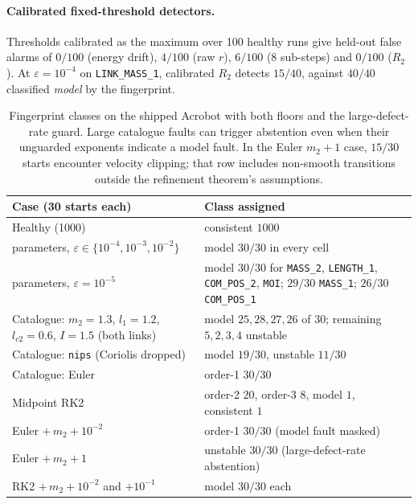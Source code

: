 \documentclass[10pt]{article}
\theoremstyle{definition}
\begin{document}
\paragraph{Calibrated fixed-threshold detectors.}
Thresholds calibrated as the maximum over 100 healthy runs give held-out
false alarms of $0/100$ (energy drift), $4/100$ (raw $r$), $6/100$
(8 sub-steps) and $0/100$ ($R_2$). At $\varepsilon=10^{-4}$ on
\texttt{LINK\_MASS\_1}, calibrated $R_2$ detects $15/40$, against $40/40$
classified \emph{model} by the fingerprint.

\begin{table}[htbp]
\centering\small
\begin{tabular}{>{\raggedright\arraybackslash}p{5.4cm}>{\raggedright\arraybackslash}p{8.6cm}}
\toprule
Case (30 starts each) & Class assigned \\
\midrule
Healthy (1000) & consistent $1000$ \\
6 parameters, $\varepsilon\in\{10^{-4},10^{-3},10^{-2}\}$ & model $30/30$ in every cell \\
6 parameters, $\varepsilon=10^{-5}$ & model $30/30$ for \texttt{MASS\_2}, \texttt{LENGTH\_1}, \texttt{COM\_POS\_2}, \texttt{MOI}; $29/30$ \texttt{MASS\_1}; $26/30$ \texttt{COM\_POS\_1} \\
Catalogue: $m_2{=}1.3$, $l_1{=}1.2$, $l_{c2}{=}0.6$, $I{=}1.5$ (both links) & model $25,28,27,26$ of $30$; remaining $5,2,3,4$ unstable \\
Catalogue: \texttt{nips} (Coriolis dropped) & model $19/30$, unstable $11/30$ \\
Catalogue: Euler & order-1 $30/30$ \\
Midpoint RK2 & order-2 $20$, order-3 $8$, model $1$, consistent $1$ \\
Euler $+\,m_2{+}10^{-2}$ & order-1 $30/30$ (model fault masked) \\
Euler $+\,m_2{+}1$ & unstable $30/30$ (large-defect-rate abstention) \\
RK2 $+\,m_2{+}10^{-2}$ and $+10^{-1}$ & model $30/30$ each \\
\bottomrule
\end{tabular}
\caption{Fingerprint classes on the shipped Acrobot with both floors and the
large-defect-rate guard. Large catalogue faults can trigger abstention even
when their unguarded exponents indicate a model fault. In the Euler
$m_2{+}1$ case, $15/30$ starts encounter velocity clipping; that row includes
non-smooth transitions outside the refinement theorem's assumptions.}
\label{tab:I}
\end{table}
\end{document}
